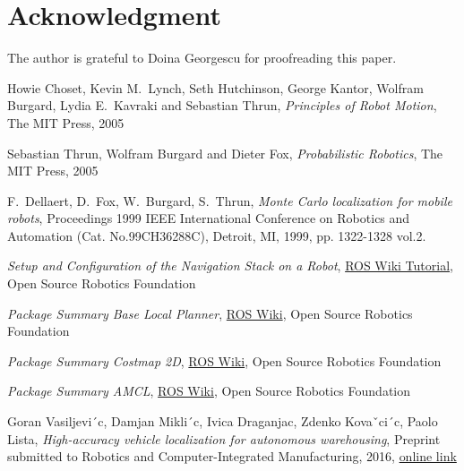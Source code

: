 \documentclass[10pt,journal,compsoc]{IEEEtran}
\begin{document}
\section*{Acknowledgment}
The author is grateful to Doina Georgescu for proofreading this paper.


\begin{thebibliography}{8}

Howie Choset, Kevin M.\ Lynch, Seth Hutchinson, George Kantor, Wolfram Burgard, Lydia E.\ Kavraki and Sebastian Thrun, \textit{Principles of Robot Motion}, The MIT Press, 2005

Sebastian Thrun, Wolfram Burgard and Dieter Fox, \textit{Probabilistic Robotics}, The MIT Press, 2005

F.\ Dellaert, D.\ Fox, W.\ Burgard, S.\ Thrun, \textit{Monte Carlo localization for mobile robots}, Proceedings 1999 IEEE International Conference on Robotics and Automation (Cat. No.99CH36288C), Detroit, MI, 1999, pp. 1322-1328 vol.2.

\textit{Setup and Configuration of the Navigation Stack on a Robot},
\href{http://wiki.ros.org/navigation/Tutorials/RobotSetup/}{ROS Wiki Tutorial}, Open Source Robotics Foundation

\textit{Package Summary Base Local Planner},
\href{http://wiki.ros.org/base_local_planner}{ROS Wiki}, Open Source Robotics Foundation

\textit{Package Summary Costmap 2D},
\href{http://wiki.ros.org/costmap_2d}{ROS Wiki}, Open Source Robotics Foundation

\textit{Package Summary AMCL},
\href{http://wiki.ros.org/amcl}{ROS Wiki}, Open Source Robotics Foundation

Goran Vasiljevi´c, Damjan Mikli´c, Ivica Draganjac, Zdenko Kovaˇci´c, Paolo Lista, \textit{High-accuracy vehicle localization for autonomous
warehousing}, Preprint submitted to Robotics and Computer-Integrated Manufacturing, 2016, \href{https://bib.irb.hr/datoteka/816062.warehousing_localization.pdf}{online link}
\end{thebibliography}
\end{document}
